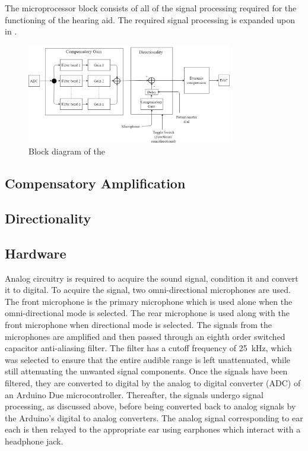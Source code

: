 \documentclass[10pt,twocolumn]{witseiepaper}
\begin{document}
The microprocessor block consists of all of the signal processing required for the functioning of the hearing aid. The required signal processing is expanded upon in .

\begin{figure}[t]
	\centering
	\includegraphics[width=0.8\textwidth]{microBlockDiagrm.png}
	\caption{Block diagram of the }
	\raggedright
	\label{fig:microBlock}	
\end{figure}

\subsection{Compensatory Amplification}

\subsection{Directionality}

\subsection{Hardware} \label{sec:hardware}
Analog circuitry is required to acquire the sound signal, condition it and convert it to digital. To acquire the signal, two omni-directional microphones are used. The front microphone is the primary microphone which is used alone when the omni-directional mode is selected. The rear microphone is used along with the front microphone when directional mode is selected. The signals from the microphones are amplified and then passed through an eighth order switched capacitor anti-aliasing filter. The filter has a cutoff frequency of 25~kHz, which was selected to ensure that the entire audible range is left unattenuated, while still attenuating the unwanted signal components. Once the signals have been filtered, they are converted to digital by the analog to digital converter (ADC) of an Arduino Due microcontroller. Thereafter, the signals undergo signal processing, as discussed above, before being converted back to analog signals by the Arduino's digital to analog converters. The analog signal corresponding to ear each is then relayed to the appropriate ear using earphones which interact with a headphone jack.
\end{document}
